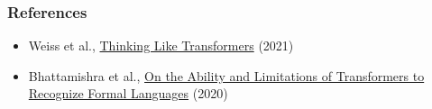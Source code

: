 \documentclass[mathserif,notheorems]{beamer}
\theoremstyle{plain} %
\theoremstyle{definition} %
\begin{document}
  \begin{frame}
    \frametitle{References}
    \begin{itemize}
      \item Weiss et al., \href{https://arxiv.org/pdf/2009.11264v2.pdf}{Thinking Like Transformers} (2021)
      \item Bhattamishra et al., \href{https://arxiv.org/pdf/2009.11264v2.pdf}{On the Ability and Limitations of Transformers to Recognize Formal Languages} (2020)
    \end{itemize}
  \end{frame}
\end{document}
